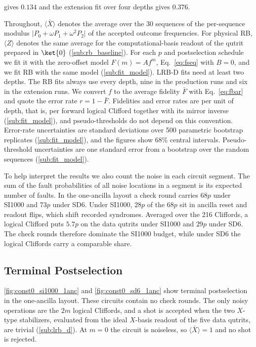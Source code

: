 gives $0.134$ and the extension fit over four depths gives $0.376$.

Throughout, $\langle \bar{X} \rangle$ denotes the average over the 30 sequences of the per-sequence modulus $\lvert P_0 + \omega P_1 + \omega^2 P_2 \rvert$ of the accepted outcome frequencies. For physical RB, $\langle Z \rangle$ denotes the same average for the computational-basis readout of the qutrit prepared in $\ket{0}$ (\autoref{sub:rb_baseline}). For each $p$ and postselection schedule we fit it with the zero-offset model $F(m) = A f^m$, Eq.~\eqref{eq:fseq} with $B = 0$, and we fit RB with the same model (\autoref{sub:fit_model}). LRB-D fits need at least two depths. The RB fits always use every depth, nine in the production runs and six in the extension runs. We convert $f$ to the average fidelity $\bar{F}$ with Eq.~\eqref{eq:fbar} and quote the error rate $r = 1 - \bar{F}$. Fidelities and error rates are per unit of depth, that is, per forward logical Clifford together with its mirror inverse (\autoref{sub:fit_model}), and pseudo-thresholds do not depend on this convention. Error-rate uncertainties are standard deviations over 500 parametric bootstrap replicates (\autoref{sub:fit_model}), and the figures show 68\% central intervals. Pseudo-threshold uncertainties are one standard error from a bootstrap over the random sequences (\autoref{sub:fit_model}).

To help interpret the results we also count the noise in each circuit segment. The sum of the fault probabilities of all noise locations in a segment is its expected number of faults. In the one-ancilla layout a check round carries $68p$ under SI1000 and $73p$ under SD6. Under SI1000, $28p$ of the $68p$ sit in ancilla reset and readout flips, which shift recorded syndromes. Averaged over the 216 Cliffords, a logical Clifford puts $5.7p$ on the data qutrits under SI1000 and $29p$ under SD6. The check rounds therefore dominate the SI1000 budget, while under SD6 the logical Cliffords carry a comparable share.

\subsection{Terminal Postselection}
\label{sub:terminal_results}

\autoref{fig:const0_si1000_1anc} and \autoref{fig:const0_sd6_1anc} show terminal postselection in the one-ancilla layout. These circuits contain no check rounds. The only noisy operations are the $2m$ logical Cliffords, and a shot is accepted when the two $X$-type stabilizers, evaluated from the ideal $X$-basis readout of the five data qutrits, are trivial (\autoref{sub:lrb_d}). At $m = 0$ the circuit is noiseless, so $\langle \bar{X} \rangle = 1$ and no shot is rejected.

